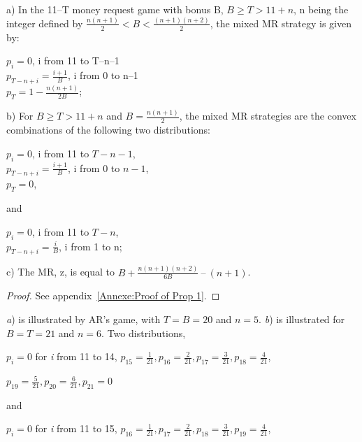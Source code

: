 \begin{Article}
\begin{refsection}[Umbhauer]
\clearpage


\begin{proposition}

a) In the 11--T money request game with bonus B, \(B \geq T > 11 + n\), n being the integer defined by \(\frac{n(n + 1)}{2} < B < \frac{(n + 1)(n + 2)}{2}\), the mixed
MR strategy is given by:

{\centering
\(p_{i} = 0\), i from 11 to T--n--1 \\
\(p_{T - n + i} = \frac{i + 1}{B}\), i from 0 to n--1 \\
\(p_{T} = 1 - \frac{n(n + 1)}{2B}\);\par}

b) For \(B \geq T > 11 + n\) and \(B=\frac{n(n + 1)}{2}\), the mixed MR strategies are the convex combinations of the following two distributions:

{\centering
$p_{i} = 0$, i from 11 to $T-n-1$, \\
$p_{T - n + i} = \frac{i + 1}{B}$, i from 0 to $n-1$, \\
$p_{T} = 0$,\par}

and

{\centering
$p_{i} = 0$, i from 11 to $T-n$, \\
$p_{T - n + i} = \frac{i}{B}$, i from 1 to n;\par}

c) The MR, z, is equal to
\(B + \frac{n(n + 1)(n + 2)}{6B}\ –\ (n + 1)\).
\end{proposition}

\begin{proof}
   See appendix~\ref{Annexe:Proof of Prop 1}. \quad \blacksquare 
\end{proof}

\vspace{0.5cm}
\emph{a}) is illustrated by AR's game, with \(T = B = 20\) and \(n = 5\).
\emph{b}) is illustrated for \(B = T = 21\) and \(n = 6\). Two distributions,

{\centering \(p_{i} = 0\) for \emph{i} from 11 to 14,
$p_{15} = \frac{1}{21}, p_{16} = \frac{2}{21}, p_{17} = \frac{3}{21}, p_{18} = \frac{4}{21}$,\par}

{\centering \(p_{19} = \frac{5}{21}, p_{20} = \frac{6}{21}, p_{21} = 0\)\par}

\noindent and

{\centering $p_{i} = 0$ for \emph{i} from 11 to 15,
$p_{16} = \frac{1}{21}, p_{17} = \frac{2}{21}, p_{18} = \frac{3}{21}, p_{19} = \frac{4}{21}$,\par} 


\end{refsection}
\end{Article}
